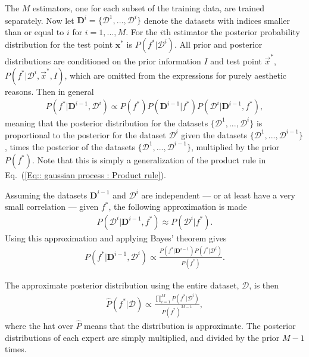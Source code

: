 \documentclass[twoside,english]{uiofysmaster}
\begin{document}
{{The $M$ estimators, one for each subset of the training data, are trained separately. Now let $\textbf{D}^{i} = \{ \mathcal{D}^1, ..., \mathcal{D}^i \}$ denote the datasets with indices smaller than or equal to $i$ for $i=1,...,M$. For the $i$th estimator the posterior probability distribution for the test point $\textbf{x}^*$ is $P(f^* | \mathcal{D}^{i})$. All prior and posterior distributions are conditioned on the prior information $I$ and test point $\vec{x}^*$, $P(f^* | \mathcal{D}^i, \vec{x}^*, I)$, which are omitted from the expressions for purely aesthetic reasons. Then in general
\begin{align}
P(f^* |  \textbf{D}^{i-1}, \mathcal{D}^i) \propto P(f^*) P(\textbf{D}^{i-1} | f^*) P (\mathcal{D}^i | \textbf{D}^{i-1}, f^*),
\end{align}
meaning that the posterior distribution for the datasets $\{ \mathcal{D}^1,..., \mathcal{D}^i \}$ is proportional to the posterior for the dataset $\mathcal{D}^i$ given the datasets $\{\mathcal{D}^1,..., \mathcal{D}^{i-1} \}$, times the posterior of the datasets $\{ \mathcal{D}^1,..., \mathcal{D}^{i-1}\}$, multiplied by the prior $P(f^*)$. Note that this is simply a generalization of the product rule in Eq.~(\ref{Eq:: gaussian process : Product rule}).

Assuming the datasets $\textbf{D}^{i-1}$ and $\mathcal{D}^i$ are independent --- or at least have a very small correlation --- given $f^*$, the following approximation is made
\begin{align}\label{Eq:: evaluating cross : BCM assumption}
P(\mathcal{D}^i | \textbf{D}^{i-1},f^*) \approx P(\mathcal{D}^i | f^*).
\end{align}
Using this approximation and applying Bayes' theorem gives
\begin{align}
P(f^* | \textbf{D}^{i-1}, \mathcal{D}^i) \propto \frac{P(f^*|\textbf{D}^{i-1}) P(f^* | \mathcal{D}^i)}{P(f^*)}. 
\end{align}

The approximate posterior distribution using the entire dataset, $\mathcal{D}$, is then 
\begin{align}\label{Eq:: evaluating cross : BCM predictive distribution}
\hat{P}(f^* | \mathcal{D}) \propto \frac{\prod_{i=1}^M P(f^*| \mathcal{D}^i)}{P(f^* )^{M-1}} ,
\end{align}
where the hat over $\hat{P}$ means that the distribution is approximate. The posterior distributions of each expert are simply multiplied, and divided by the prior $M-1$ times.

}}
\end{document}
